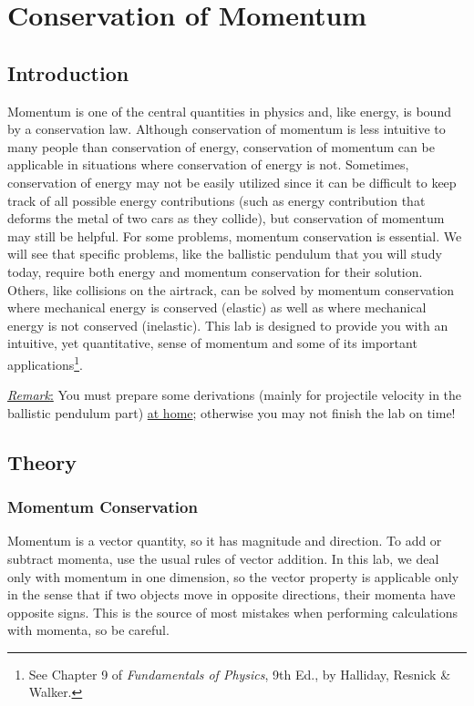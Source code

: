 \chapter{Conservation of Momentum}

\section{Introduction}

Momentum is one of the central quantities in physics and, like energy, is bound by a conservation law. Although conservation of momentum is less intuitive to many people than conservation of energy, conservation of momentum can be applicable in situations where conservation of energy is not. Sometimes, conservation of energy may not be easily utilized since it can be difficult to keep track of all possible energy contributions (such as energy contribution that deforms the metal of two cars as they collide), but conservation of momentum may still be helpful. For some problems, momentum conservation is essential. We will see that specific problems, like the ballistic pendulum that you will study today, require both energy and momentum conservation for their solution. Others, like collisions on the airtrack, can be solved by momentum conservation where mechanical energy is conserved (elastic) as well as where mechanical energy is not conserved (inelastic). This lab is designed to provide you with an intuitive, yet quantitative, sense of momentum and some of its important applications\footnote{See Chapter 9 of \emph{Fundamentals of Physics}, 9th Ed., by Halliday, Resnick \& Walker.}.\myskip

\underline{\emph{Remark}:} You must prepare some derivations (mainly for projectile velocity in the ballistic pendulum part) \underline{at home}; otherwise you may not finish the lab on time!

\section{Theory}
\subsection{Momentum Conservation}
Momentum is a vector quantity, so it has magnitude and direction. To add or subtract momenta, use the usual rules of vector addition. In this lab, we deal only with momentum in one dimension, so the vector property is applicable only in the sense that if two objects move in opposite directions, their momenta have opposite signs. This is the source of most mistakes when performing calculations with momenta, so be careful. \myskip

